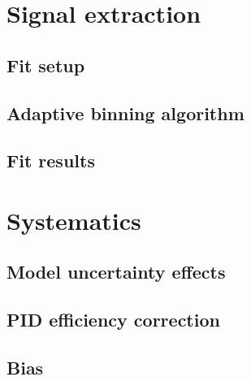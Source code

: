 \documentclass[oneside,a4paper,openany,12pt]{scrbook}
\begin{document}
\chapter{Signal extraction}
\section{Fit setup}
\section{Adaptive binning algorithm}
\section{Fit results}

\chapter{Systematics}
\section{Model uncertainty effects}
\section{PID efficiency correction}
\section{Bias}
\end{document}
